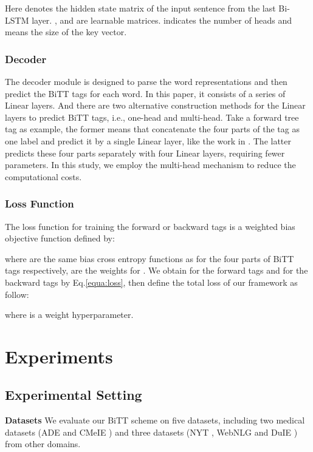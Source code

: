 \documentclass[conference]{IEEEtran}
\begin{document}
Here  denotes the hidden state matrix  of the input sentence from the last Bi-LSTM layer. ,  and  are learnable matrices.  indicates the number of heads and  means the size of the key vector.







\subsubsection{Decoder}
\label{sssec:decoder}
The decoder module is designed to parse the word representations and then predict the BiTT tags for each word. In this paper, it consists of a series of Linear layers. And there are two alternative construction methods for the Linear layers to predict BiTT tags, i.e., one-head and multi-head. Take a forward tree tag as example, the former means that concatenate the four parts of the tag as one label and predict it by a single Linear layer, like the work in \cite{Zheng2017Joint}. The latter predicts these four parts separately with four Linear layers, requiring fewer parameters. In this study, we employ the multi-head mechanism to reduce the computational costs.

\subsubsection{Loss Function}
The loss function for training the forward or backward tags is a weighted bias objective function defined by:

where  are the same bias cross entropy functions as \cite{Zheng2017Joint} for the four parts of BiTT tags respectively,  are the weights for . We obtain  for the forward tags and  for the backward tags by Eq.\eqref{equa:loss}, then define the total loss  of our framework as follow:

where  is a weight hyperparameter. 



\section{Experiments}
\label{sect:exper}
\subsection{Experimental Setting}
\textbf{Datasets}
We evaluate our BiTT scheme on five datasets, including two medical datasets (ADE \cite{Gurulingappa2012Development} and CMeIE \cite{Guan2020CMeIE}) and three datasets (NYT \cite{Riedel2010Modeling}, WebNLG \cite{Gardent2017Creating} and DuIE \cite{Li2019A}) from other domains. 
\end{document}
